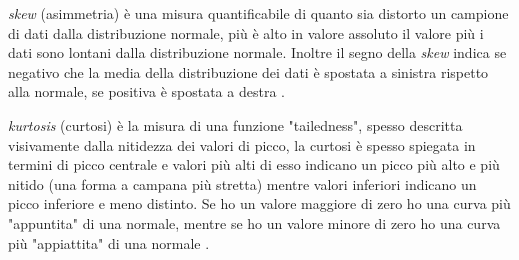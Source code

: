 \noindent
\textit{skew} (asimmetria) è una misura quantificabile di quanto sia distorto un campione di dati dalla distribuzione normale, più è alto in valore assoluto il valore più i dati sono lontani dalla distribuzione normale.
Inoltre il segno della \textit{skew} indica se negativo che la media della distribuzione dei dati è spostata a sinistra rispetto alla normale, se positiva è spostata a destra \cite{skewness}.

\noindent 
\textit{kurtosis} (curtosi) è la misura di una funzione "tailedness", spesso descritta visivamente dalla nitidezza dei valori di picco, la curtosi è spesso spiegata in termini di picco centrale e valori più alti di esso indicano un picco più alto e più nitido (una forma a campana più stretta) mentre valori inferiori indicano un picco inferiore e meno distinto. Se ho un valore maggiore di zero ho una curva più "appuntita" di una normale, mentre se ho un valore minore di zero ho una curva più "appiattita" di una normale \cite{kurtosis}.







